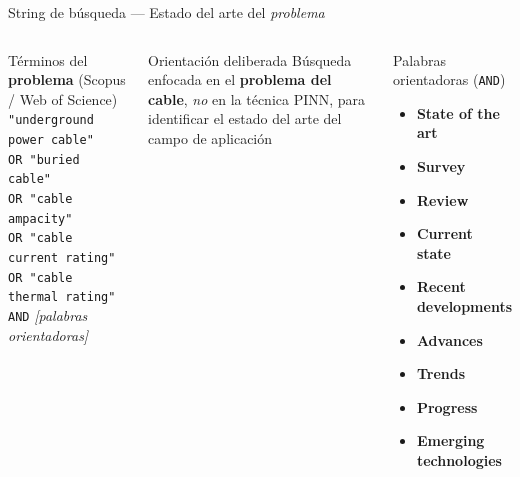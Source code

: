 \documentclass[aspectratio=169]{beamer}
\begin{document}
\begin{frame}{String de búsqueda --- Estado del arte del \emph{problema}}
  \begin{columns}[T]
      \begin{exampleblock}{Términos del \textbf{problema} (Scopus / Web of Science)}
        \small
        \texttt{"underground power cable"}\\
        \texttt{OR "buried cable"}\\
        \texttt{OR "cable ampacity"}\\
        \texttt{OR "cable current rating"}\\
        \texttt{OR "cable thermal rating"}\\[4pt]
        \texttt{AND} \textit{[palabras orientadoras]}
      \end{exampleblock}
      \vspace{0.3em}
      \begin{block}{\small Orientación deliberada}
        \footnotesize
        Búsqueda enfocada en el \textbf{problema del cable},
        \emph{no} en la técnica PINN,
        para identificar el estado del arte
        del campo de aplicación
      \end{block}
      \begin{alertblock}{Palabras orientadoras (\texttt{AND})}
        \small
        \begin{itemize}
          \item \textbf{State of the art}
          \item \textbf{Survey}
          \item \textbf{Review}
          \item \textbf{Current state}
          \item \textbf{Recent developments}
          \item \textbf{Advances}
          \item \textbf{Trends}
          \item \textbf{Progress}
          \item \textbf{Emerging technologies}
        \end{itemize}
      \end{alertblock}
  \end{columns}
\end{frame}
\end{document}
